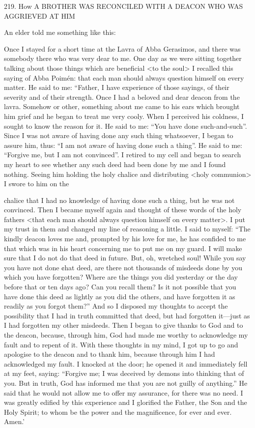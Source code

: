 219.
How A BROTHER WAS RECONCILED WITH
A DEACON WHO WAS AGGRIEVED AT HIM

An elder told me something like this:

Once I stayed for a short time at the Lavra of Abba Gerasimos, and
there was somebody there who was very dear to me.
One day as we
were sitting together talking about those things which are beneficial
<to the soul> I recalled this saying of Abba Poimén: that each man
should always question himself on every matter.
He said to me:
“Father, I have experience of those sayings, of their severity and of
their strength.
Once I had a beloved and dear deacon from the
lavra.
Somehow or other, something about me came to his ears
which brought him grief and he began to treat me very cooly.
When
I perceived his coldness, I sought to know the reason for it.
He said
to me: “You have done such-and-such”.
Since I was not aware of
having done any such thing whatsoever, I began to assure him, thus:
“I am not aware of having done such a thing”.
He said to me:
“Forgive me, but I am not convinced”.
I retired to my cell and
began to search my heart to see whether any such deed had been
done by me and I found nothing.
Seeing him holding the holy
chalice and distributing <holy communion> I swore to him on the

chalice that I had no knowledge of having done such a thing, but
he was not convinced.
Then I became myself again and thought of
these words of the holy fathers <that each man should always
question himself on every matter>.
I put my trust in them and
changed my line of reasoning a little.
I said to myself: “The kindly
deacon loves me and, prompted by his love for me, he has confided
to me that which was in his heart concerning me to put me on my
guard.
I will make sure that I do not do that deed in future.
But,
oh, wretched soul! While you say you have not done ¢hat deed, are
there not thousands of misdeeds done by you which you have
forgotten? Where are the things you did yesterday or the day before
that or ten days ago? Can you recall them? Is it not possible that
you have done this deed as lightly as you did the others, and have
forgotten it as readily as you forgot them?” And so I disposed my
thoughts to accept the possibility that I had in truth committed that
deed, but had forgotten it—just as I had forgotten my other
misdeeds.
Then I began to give thanks to God and to the deacon,
because, through him, God had made me worthy to acknowledge
my fault and to repent of it.
With these thoughts in my mind, I got
up to go and apologise to the deacon and to thank him, because
through him I had acknowledged my fault.
I knocked at the door;
he opened it and immediately fell at my feet, saying: “Forgive me;
I was deceived by demons into thinking that of you.
But in truth,
God has informed me that you are not guilly of anything.” He said
that he would not allow me to offer my assurance, for there was no
need.
I was greatly edified by this experience and I glorified the
Father, the Son and the Holy Spirit; to whom be the power and the
magnificence, for ever and ever.
Amen.'

